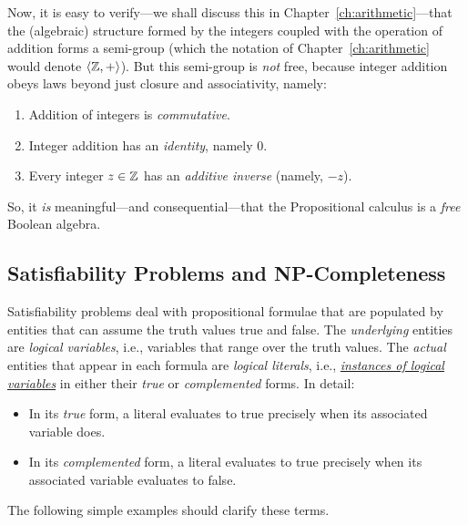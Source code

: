 Now, it is easy to verify---we shall discuss this in Chapter~\ref{ch:arithmetic}---that the (algebraic) structure formed by the integers coupled with the operation of addition forms a semi-group (which the notation of Chapter~\ref{ch:arithmetic} would denote $\langle \mathbb{Z}, + \rangle$).  But this semi-group is {\em not} free, because integer addition obeys laws beyond just closure and associativity, namely:
\begin{enumerate}
\item
Addition of integers is {\em commutative}.
\medskip\item
Integer addition has an {\em identity}, namely $0$.
\medskip\item
Every integer $z \in \mathbb{Z}$ has an {\it additive inverse} (namely, $-z$).
\end{enumerate}

So, it {\em is} meaningful---and consequential---that the Propositional calculus is a {\em free} Boolean algebra.


\subsection{Satisfiability Problems and {\sf NP}-Completeness}
\label{sec:Satisfiability}


Satisfiability problems deal with propositional formulae that are populated by entities that can assume the truth values {\sc true} and {\sc false}.  The {\em underlying} entities are {\it logical variables}, i.e., variables that range over the truth values.  The {\em actual} entities that appear in each formula are {\it logical literals}, i.e., \underline{\em instances of logical variables} in either their {\em true} or {\em complemented} forms.  In detail:
\begin{itemize}
\item
In its {\em true} form, a literal evaluates to {\sc true} precisely when its associated variable does.
\medskip\item
In its {\em complemented} form, a literal evaluates to {\sc true} precisely when its associated variable evaluates to {\sc false}.
\end{itemize}
The following simple examples should clarify these terms.

